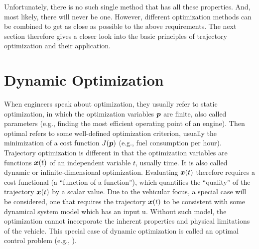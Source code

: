 Unfortunately, there is no such single method that has all these properties. And, most likely, there will never be one. However, different optimization methods can be combined to get as close as possible to the above requirements. The next section therefore gives a closer look into the basic principles of trajectory optimization and their application.

\section{Dynamic Optimization}\label{S:57.2}

When engineers speak about optimization, they usually refer to static optimization, in which the optimization variables  $\boldsymbol{p}$  are finite, also called parameters (e.g., finding the most efficient operating point of an engine). Then optimal refers to some well-defined optimization criterion, usually the minimization of a cost function $J(\boldsymbol{p})$ (e.g., fuel consumption per hour). 
Trajectory optimization is different in that the optimization variables are functions $\boldsymbol{x}(t)$ of an independent variable $t$, usually time. It is also called dynamic or infinite-dimensional optimization. Evaluating $\boldsymbol{x}(t)$ therefore requires a cost functional (a “function of a function”), which quantifies the “quality” of the trajectory $\boldsymbol{x}(t)$ by a scalar value. 
Due to the vehicular focus, a special case will be considered, one that requires the trajectory $\boldsymbol{x}(t)$ to be consistent with some dynamical system model which has an input u. Without such model, the optimization cannot incorporate the inherent properties and physical limitations of the vehicle. This special case of dynamic optimization is called an optimal control problem (e.g., \cite{Lewis_OC}).

